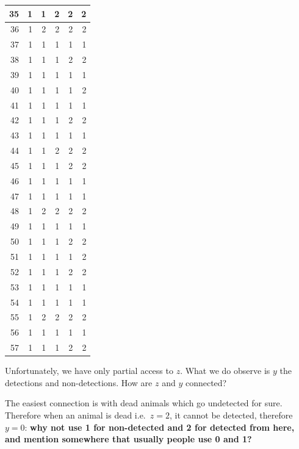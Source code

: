 \documentclass[
  12pt,
]{krantz}
\begin{document}
\begin{tabular}{r|r|r|r|r|r}
\hline
35 & 1 & 1 & 2 & 2 & 2\\
\hline
36 & 1 & 2 & 2 & 2 & 2\\
\hline
37 & 1 & 1 & 1 & 1 & 1\\
\hline
38 & 1 & 1 & 1 & 2 & 2\\
\hline
39 & 1 & 1 & 1 & 1 & 1\\
\hline
40 & 1 & 1 & 1 & 1 & 2\\
\hline
41 & 1 & 1 & 1 & 1 & 1\\
\hline
42 & 1 & 1 & 1 & 2 & 2\\
\hline
43 & 1 & 1 & 1 & 1 & 1\\
\hline
44 & 1 & 1 & 2 & 2 & 2\\
\hline
45 & 1 & 1 & 1 & 2 & 2\\
\hline
46 & 1 & 1 & 1 & 1 & 1\\
\hline
47 & 1 & 1 & 1 & 1 & 1\\
\hline
48 & 1 & 2 & 2 & 2 & 2\\
\hline
49 & 1 & 1 & 1 & 1 & 1\\
\hline
50 & 1 & 1 & 1 & 2 & 2\\
\hline
51 & 1 & 1 & 1 & 1 & 2\\
\hline
52 & 1 & 1 & 1 & 2 & 2\\
\hline
53 & 1 & 1 & 1 & 1 & 1\\
\hline
54 & 1 & 1 & 1 & 1 & 1\\
\hline
55 & 1 & 2 & 2 & 2 & 2\\
\hline
56 & 1 & 1 & 1 & 1 & 1\\
\hline
57 & 1 & 1 & 1 & 2 & 2\\
\hline
\end{tabular}

Unfortunately, we have only partial access to \(z\). What we do observe is \(y\) the detections and non-detections. How are \(z\) and \(y\) connected?

The easiest connection is with dead animals which go undetected for sure. Therefore when an animal is dead i.e.~\(z = 2\), it cannot be detected, therefore \(y = 0\): \textbf{why not use 1 for non-detected and 2 for detected from here, and mention somewhere that usually people use 0 and 1?}
\end{document}
